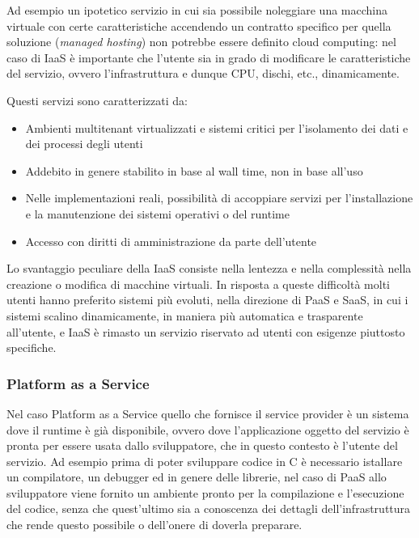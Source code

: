 Ad esempio un ipotetico servizio in cui sia possibile noleggiare una
macchina virtuale con certe caratteristiche accendendo un contratto
specifico per quella soluzione (\emph{managed hosting}) non potrebbe
essere definito cloud computing: nel caso di IaaS è importante che
l'utente sia in grado di modificare le caratteristiche del servizio,
ovvero l'infrastruttura e dunque CPU, dischi, etc., dinamicamente.

Questi servizi sono caratterizzati da:

\begin{itemize}
\tightlist
\item
  Ambienti multitenant virtualizzati e sistemi critici per l'isolamento
  dei dati e dei processi degli utenti
\item
  Addebito in genere stabilito in base al wall time, non in base all'uso
\item
  Nelle implementazioni reali, possibilità di accoppiare servizi per
  l'installazione e la manutenzione dei sistemi operativi o del runtime
\item
  Accesso con diritti di amministrazione da parte dell'utente
\end{itemize}

Lo svantaggio peculiare della IaaS consiste nella lentezza e nella
complessità nella creazione o modifica di macchine virtuali. In risposta
a queste difficoltà molti utenti hanno preferito sistemi più evoluti,
nella direzione di PaaS e SaaS, in cui i sistemi scalino dinamicamente,
in maniera più automatica e trasparente all'utente, e IaaS è rimasto un
servizio riservato ad utenti con esigenze piuttosto specifiche.

\subsubsection{Platform as a Service}\label{platform-as-a-service}

Nel caso Platform as a Service quello che fornisce il service provider è
un sistema dove il runtime è già disponibile, ovvero dove l'applicazione
oggetto del servizio è pronta per essere usata dallo sviluppatore, che
in questo contesto è l'utente del servizio. Ad esempio prima di poter
sviluppare codice in C è necessario istallare un compilatore, un
debugger ed in genere delle librerie, nel caso di PaaS allo sviluppatore
viene fornito un ambiente pronto per la compilazione e l'esecuzione del
codice, senza che quest'ultimo sia a conoscenza dei dettagli
dell'infrastruttura che rende questo possibile o dell'onere di doverla
preparare.

